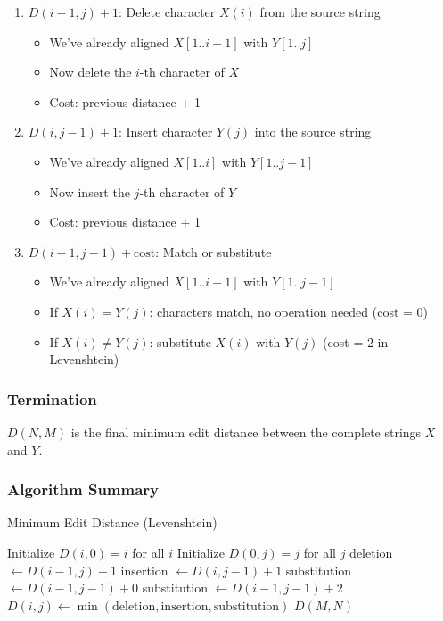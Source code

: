 \documentclass[11pt,a4paper]{article}
\theoremstyle{definition}
\theoremstyle{plain}
\theoremstyle{remark}
\begin{document}
\begin{enumerate}
    \item \textbf{$D(i-1,j) + 1$}: Delete character $X(i)$ from the source string
    \begin{itemize}
        \item We've already aligned $X[1..i-1]$ with $Y[1..j]$
        \item Now delete the $i$-th character of $X$
        \item Cost: previous distance + 1
    \end{itemize}
    
    \item \textbf{$D(i,j-1) + 1$}: Insert character $Y(j)$ into the source string
    \begin{itemize}
        \item We've already aligned $X[1..i]$ with $Y[1..j-1]$
        \item Now insert the $j$-th character of $Y$
        \item Cost: previous distance + 1
    \end{itemize}
    
    \item \textbf{$D(i-1,j-1) + \text{cost}$}: Match or substitute
    \begin{itemize}
        \item We've already aligned $X[1..i-1]$ with $Y[1..j-1]$
        \item If $X(i) = Y(j)$: characters match, no operation needed (cost = 0)
        \item If $X(i) \neq Y(j)$: substitute $X(i)$ with $Y(j)$ (cost = 2 in Levenshtein)
    \end{itemize}
\end{enumerate}

\subsubsection{Termination}

$D(N,M)$ is the final minimum edit distance between the complete strings $X$ and $Y$.

\newpage
\subsubsection{Algorithm Summary}

\begin{algorithm}
\caption{Minimum Edit Distance (Levenshtein)}
\begin{algorithmic}
\STATE Initialize $D(i,0) = i$ for all $i$
\STATE Initialize $D(0,j) = j$ for all $j$
        \STATE deletion $\leftarrow D(i-1,j) + 1$
        \STATE insertion $\leftarrow D(i,j-1) + 1$
            \STATE substitution $\leftarrow D(i-1,j-1) + 0$
        \ELSE
            \STATE substitution $\leftarrow D(i-1,j-1) + 2$
        \ENDIF
        \STATE $D(i,j) \leftarrow \min(\text{deletion}, \text{insertion}, \text{substitution})$
    \ENDFOR
\ENDFOR
\RETURN $D(M,N)$
\end{algorithmic}
\end{algorithm}
\end{document}
